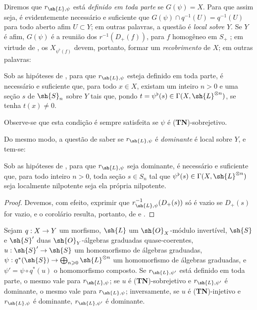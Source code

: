 \documentclass[oneside,10pt]{amsart}
\makeatletter
\renewcommand{\geq}{\geqslant}
\newcommand{\ega@arrow}[2]{\mathchoice{#1}{#2}{#2}{#2}}
\renewcommand{\to}{\ega@arrow{\longrightarrow}{\rightarrow}}
\newcommand{\oldpage}[2][]{\marginnote{\normalfont\footnotesize\textbf{#1}~|~#2}\ignorespaces}
\let\EGAOriginalLabel\label
\renewcommand{\label}[1]{\phantomsection\EGAOriginalLabel{#1}}
\makeatother
\begin{document}
Diremos que $r_{\sh{L},\psi}$ está \emph{definido em toda parte} se $G(\psi)=X$.
Para que assim seja, é evidentemente necessário e suficiente que $G(\psi)\cap q^{-1}(U)=q^{-1}(U)$ para todo aberto afim $U\subset Y$;
em outras palavras, a questão é \emph{local sobre $Y$}.
Se $Y$ é afim, $G(\psi)$ é a reunião dos $r^{-1}(D_+(f))$, para $f$ homogêneo em $S_+$ ;
em virtude de , os $X_{\psi^\flat(f)}$ devem, portanto, formar um \emph{recobrimento} de $X$;
em outras palavras:

\begin{corollary}[3.7.4]
\label{II.3.7.4}
Sob as hipóteses de , para que $r_{\sh{L},\psi}$ esteja definido em toda parte, é necessário e suficiente que, para todo $x\in X$, existam um inteiro $n>0$ e uma seção $s$ de $\sh{S}_n$ sobre $Y$ tais que, pondo $t=\psi^\flat(s)\in\Gamma(X,\sh{L}^{\otimes n})$, se tenha $t(x)\neq0$.
\end{corollary}
\oldpage[II]{67}

Observe-se que esta condição é sempre satisfeita se $\psi$ é (\textbf{TN})-sobrejetivo.

Do mesmo modo, a questão de saber se $r_{\sh{L},\psi}$ é \emph{dominante} é local sobre $Y$, e tem-se:

\begin{corollary}[3.7.5]
\label{II.3.7.5}
Sob as hipóteses de , para que $r_{\sh{L},\psi}$ seja dominante, é necessário e suficiente que, para todo inteiro $n>0$, toda seção $s\in S_n$ tal que $\psi^\flat(s)\in\Gamma(X,\sh{L}^{\otimes n})$ seja localmente nilpotente seja ela própria nilpotente.
\end{corollary}

\begin{proof}
Devemos, com efeito, exprimir que $r_{\sh{L},\psi}^{-1}(D_+(s))$ só é vazio se $D_+(s)$ for vazio, e o corolário resulta, portanto, de  e .
\end{proof}

\begin{proposition}[3.7.6]
\label{II.3.7.6}
Sejam $q:X\to Y$ um morfismo, $\sh{L}$ um $\sh{O}_X$-módulo invertível, $\sh{S}$ e $\sh{S}'$ duas $\sh{O}_Y$-álgebras graduadas quase-coerentes, $u:\sh{S}'\to\sh{S}$ um homomorfismo de álgebras graduadas, $\psi:q^*(\sh{S})\to\bigoplus_{n\geq0}\sh{L}^{\otimes n}$ um homomorfismo de álgebras graduadas, e $\psi'=\psi\circ q^*(u)$ o homomorfismo composto.
Se $r_{\sh{L},\psi'}$ está definido em toda parte, o mesmo vale para $r_{\sh{L},\psi}$;
se $u$ é (\textbf{TN})-sobrejetivo e $r_{\sh{L},\psi'}$ é dominante, o mesmo vale para $r_{\sh{L},\psi}$;
inversamente, se $u$ é (\textbf{TN})-injetivo e $r_{\sh{L},\psi}$ é dominante, $r_{\sh{L},\psi'}$ é dominante.
\end{proposition}
\end{document}
